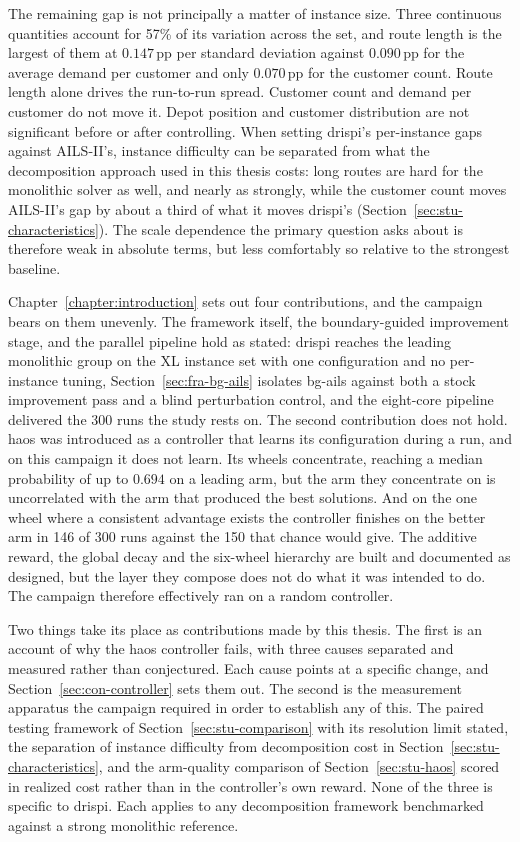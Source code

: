 The remaining gap is not principally a matter of instance size. Three
continuous quantities account for 57\% of its variation across the set, and
route length is the largest of them at $0.147$\,pp per standard deviation against
$0.090$\,pp for the average demand per customer and only $0.070$\,pp for the
customer count. Route length alone drives the run-to-run spread. Customer count
and demand per customer do not move it. Depot position and customer
distribution are not significant before or after controlling.
When setting \gls{drispi}'s per-instance gaps against AILS-II's, instance
difficulty can be separated from what the decomposition approach used in this thesis costs: long routes are hard for the monolithic
solver as well, and nearly as strongly, while the customer count moves AILS-II's
gap by about a third of what it moves \gls{drispi}'s (Section~\ref{sec:stu-characteristics}). 
The scale dependence the primary question asks about is therefore weak in absolute terms, but less comfortably so
relative to the strongest baseline.

Chapter~\ref{chapter:introduction} sets out four contributions, and the campaign
bears on them unevenly. The framework itself, the boundary-guided improvement
stage, and the parallel pipeline hold as stated: \gls{drispi} reaches the leading
monolithic group on the XL instance set with one configuration and no
per-instance tuning, Section~\ref{sec:fra-bg-ails} isolates \gls{bg-ails} against both a
stock improvement pass and a blind perturbation control, and the eight-core
pipeline delivered the 300 runs the study rests on. The second contribution
does not hold. \gls{haos} was introduced as a controller that learns its
configuration during a run, and on this campaign it does not learn. Its wheels
concentrate, reaching a median probability of up to $0.694$ on a leading arm, but
the arm they concentrate on is uncorrelated with the arm that produced the best solutions. And on
the one wheel where a consistent advantage exists the controller finishes on
the better arm in 146 of 300 runs against the 150 that chance would give. The
additive reward, the global decay and the six-wheel hierarchy are built and
documented as designed, but the layer they compose does not do what it was intended to do.
The campaign therefore effectively ran on a random controller.

Two things take its place as contributions made by this thesis. The first is an account of why the \gls{haos} controller fails, with three causes separated and measured rather than conjectured. Each cause points at a
specific change, and Section~\ref{sec:con-controller} sets them out. The
second is the measurement apparatus the campaign required in order to establish
any of this. The paired testing framework of Section~\ref{sec:stu-comparison} with its resolution limit stated, the
separation of instance difficulty from decomposition cost in Section~\ref{sec:stu-characteristics}, and the arm-quality comparison of Section~\ref{sec:stu-haos} scored in realized cost rather than in the
controller's own reward. None of the three is specific to \gls{drispi}\@. Each
applies to any decomposition framework benchmarked against a strong monolithic
reference.

